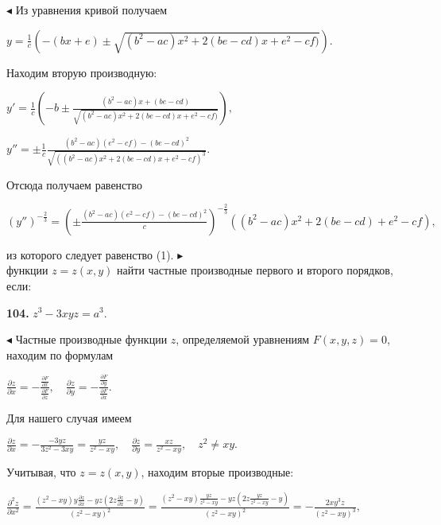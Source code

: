 \documentclass[12pt,a4paper]{book}
\begin{document}
    $\blacktriangleleft$ Из уравнения кривой получаем
    \begin{center}
        $\displaystyle y = \frac{1}{c}\left(-(bx+e) \pm \sqrt{(b^2-ac)x^2 + 2(be-cd)x+e^2-cf)}\right).$
    \end{center}
    Находим вторую производную:
    \begin{center}
        $\displaystyle y' = \frac{1}{c}\left(-b \pm \frac{(b^2-ac)x+(be-cd)}{\sqrt{(b^2-ac)x^2+2(be-cd)x + e^2 -cf)}}\right),$
    \end{center}
    \begin{center}
        $\displaystyle y''=\pm \frac{1}{c} \frac{(b^2-ac)(e^2-cf)-(be-cd)^2}{\sqrt{((b^2-ac)x^2+2(be-cd)x + e^2 -cf)^3}}.$
    \end{center}
    Отсюда получаем равенство
    \begin{center}
        $\displaystyle (y'')^{-\frac{2}{3}} = \left(\pm \frac{(b^2-ac)(e^2-cf)-(be-cd)^2}{c}\right)^{-\frac{2}{3}}((b^2-ac)x^2 + 2(be-cd)+e^2 -cf),$
    \end{center}
    из которого следует равенство (1). $\blacktriangleright$\\
     функции $z=z(x,y)$ найти частные производные первого и второго порядков, если:
    
    \textbf{104.} $z^3-3xyz=a^3.$
    
    $\blacktriangleleft$ Частные производные функции $z$, определяемой уравнениям $F(x,y,z) = 0$, находим по формулам
    \begin{center}
        $\displaystyle\frac{\partial z}{\partial x} = - \frac{\frac{\partial F}{\partial x}}{\frac{\partial F}{\partial z}}, \quad \frac{\partial z}{\partial y} = - \frac{\frac{\partial F}{\partial y}}{\frac{\partial F}{\partial x}}.$
    \end{center}
    Для нашего случая имеем
    \begin{center}
        $\displaystyle\frac{\partial z}{\partial x} = - \frac{-3yz}{3z^2-3xy} = \frac{yz}{z^2-xy}, \quad \frac{\partial z}{\partial y} = \frac{xz}{z^2-xy}, \quad z^2 \neq xy.$
    \end{center}
    Учитывая, что $z=z(x,y)$, находим вторые производные:
    \begin{center}
        $\displaystyle\frac{\partial^2 z}{\partial x^2} = \frac{(z^2 - xy) y \frac{\partial z}{\partial x} - yz\left(2z \frac{\partial z}{\partial x} - y\right)}{(z^2-xy)^2} = \frac{(z^2-xy)\frac{yz}{z^2-xy} - yz \left(2z \frac{yz}{z^2-xy} - y\right)}{(z^2 - xy)^2} = - \frac{2x y^3 z}{(z^2 - xy)^3},$
    \end{center}
    
\end{document}
